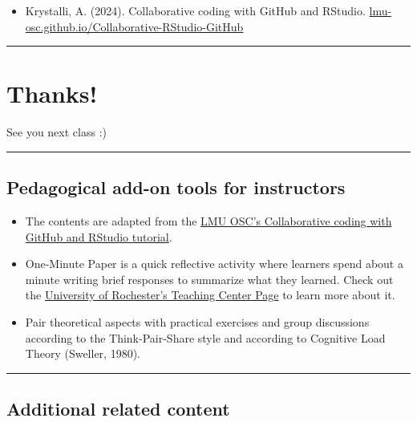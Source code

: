 \documentclass[
  letterpaper,
  DIV=11,
  numbers=noendperiod]{scrartcl}
\providecommand{\tightlist}{%
  \setlength{\itemsep}{0pt}\setlength{\parskip}{0pt}}
\begin{document}
\begin{itemize}
\tightlist
\item
  Krystalli, A. (2024). Collaborative coding with GitHub and RStudio.
  \href{https://lmu-osc.github.io/Collaborative-RStudio-GitHub/}{lmu-osc.github.io/Collaborative-RStudio-GitHub}
\end{itemize}

\begin{center}\rule{0.5\linewidth}{0.5pt}\end{center}

\section{\texorpdfstring{Thanks! }{Thanks!  }}\label{thanks}

See you next class :)

\begin{center}\rule{0.5\linewidth}{0.5pt}\end{center}

\subsection{Pedagogical add-on tools for
instructors}\label{pedagogical-add-on-tools-for-instructors}

\begin{itemize}
\tightlist
\item
  The contents are adapted from the
  \href{https://lmu-osc.github.io/Collaborative-RStudio-GitHub/}{LMU
  OSC's Collaborative coding with GitHub and RStudio tutorial}.
\item
  One-Minute Paper is a quick reflective activity where learners spend
  about a minute writing brief responses to summarize what they learned.
  Check out the
  \href{https://www.rochester.edu/college/teaching/teaching-guidance/one-minute-paper.html}{University
  of Rochester's Teaching Center Page} to learn more about it.
\item
  Pair theoretical aspects with practical exercises and group
  discussions according to the Think-Pair-Share style and according to
  Cognitive Load Theory (Sweller, 1980).
\end{itemize}

\begin{center}\rule{0.5\linewidth}{0.5pt}\end{center}

\subsection{Additional related
content}\label{additional-related-content}
\end{document}
